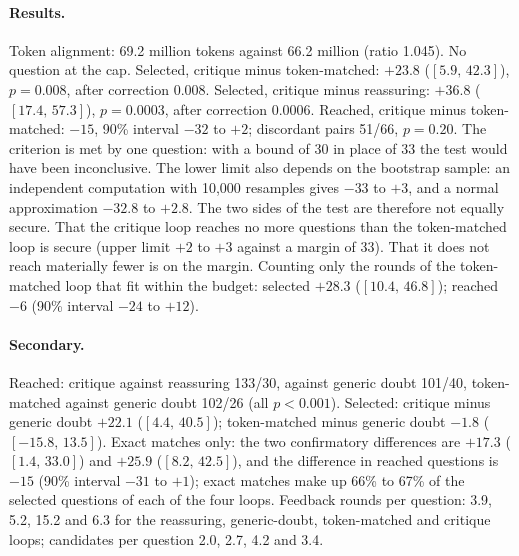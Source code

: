 \documentclass[11pt]{article}
\newcommand{\ci}[2]{$[#1,\,#2]$}
\begin{document}
\paragraph{Results.}
Token alignment: 69.2 million tokens against 66.2 million (ratio 1.045). No question at the cap.
Selected, critique minus token-matched: $+23.8$ (\ci{5.9}{42.3}), $p=0.008$, after correction $0.008$.
Selected, critique minus reassuring: $+36.8$ (\ci{17.4}{57.3}), $p=0.0003$, after correction $0.0006$.
Reached, critique minus token-matched: $-15$, 90\% interval $-32$ to $+2$; discordant pairs 51/66, $p=0.20$.
The criterion is met by one question: with a bound of 30 in place of 33 the test would have been inconclusive.
The lower limit also depends on the bootstrap sample: an independent computation with 10,000 resamples gives $-33$ to $+3$, and a normal approximation $-32.8$ to $+2.8$.
The two sides of the test are therefore not equally secure. That the critique loop reaches no more questions than the token-matched loop is secure (upper limit $+2$ to $+3$ against a margin of 33). That it does not reach materially fewer is on the margin.
Counting only the rounds of the token-matched loop that fit within the budget: selected $+28.3$ (\ci{10.4}{46.8}); reached $-6$ (90\% interval $-24$ to $+12$).

\paragraph{Secondary.}
Reached: critique against reassuring 133/30, against generic doubt 101/40, token-matched against generic doubt 102/26 (all $p<0.001$).
Selected: critique minus generic doubt $+22.1$ (\ci{4.4}{40.5}); token-matched minus generic doubt $-1.8$ (\ci{-15.8}{13.5}).
Exact matches only: the two confirmatory differences are $+17.3$ (\ci{1.4}{33.0}) and $+25.9$ (\ci{8.2}{42.5}), and the difference in reached questions is $-15$ (90\% interval $-31$ to $+1$); exact matches make up 66\% to 67\% of the selected questions of each of the four loops.
Feedback rounds per question: 3.9, 5.2, 15.2 and 6.3 for the reassuring, generic-doubt, token-matched and critique loops; candidates per question 2.0, 2.7, 4.2 and 3.4.
\end{document}

